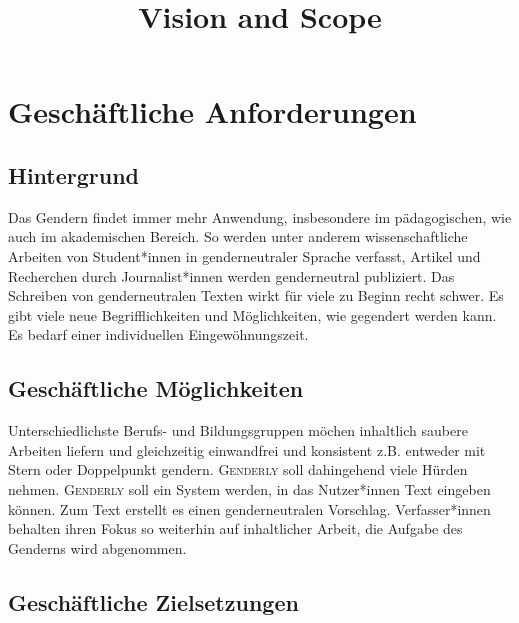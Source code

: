 \documentclass[paper=a4, parskip=half]{scrreprt}
\begin{document}
\title{Vision and Scope} %







\chapter{Geschäftliche Anforderungen}
\section{Hintergrund}
Das Gendern findet immer mehr Anwendung, insbesondere im pädagogischen, wie auch im akademischen Bereich. So werden unter anderem wissenschaftliche Arbeiten von Student*innen in genderneutraler Sprache verfasst, Artikel und Recherchen durch Journalist*innen werden genderneutral publiziert. Das Schreiben von genderneutralen Texten wirkt für viele zu Beginn recht schwer. Es gibt viele neue Begrifflichkeiten und Möglichkeiten, wie gegendert werden kann. Es bedarf einer individuellen Eingewöhnungszeit.


\section{Geschäftliche Möglichkeiten}
Unterschiedlichste Berufs- und Bildungsgruppen möchen inhaltlich saubere Arbeiten liefern und gleichzeitig einwandfrei und konsistent z.B. entweder mit Stern oder Doppelpunkt gendern. \textsc{Genderly} soll dahingehend viele Hürden nehmen. \textsc{Genderly} soll ein System werden, in das Nutzer*innen Text eingeben können. Zum Text erstellt es einen genderneutralen Vorschlag. Verfasser*innen behalten ihren Fokus so weiterhin auf inhaltlicher Arbeit, die Aufgabe des Genderns wird abgenommen.

\section{Geschäftliche Zielsetzungen}
\end{document}
